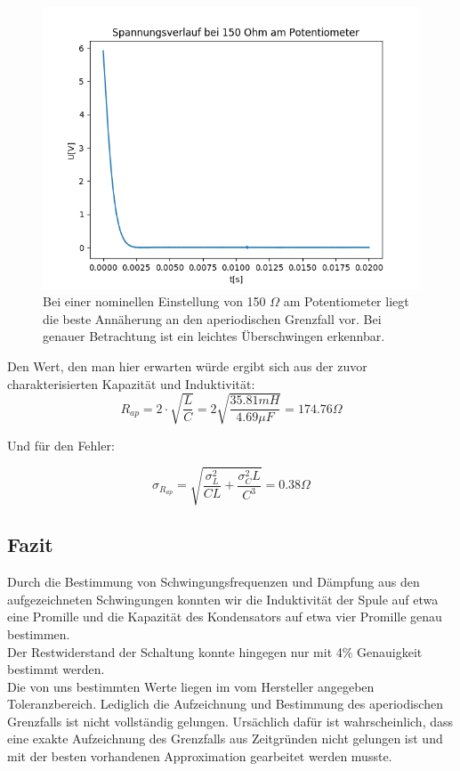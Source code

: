 \documentclass[12pt,a4paper]{article}
\begin{document}
\begin{figure}
\begin{center}
\includegraphics[scale=0.7]{Bilder/Spannungsverlauf150Ohm}
\caption{Bei einer nominellen Einstellung von 150 $\Omega$ am Potentiometer liegt die beste Annäherung an den aperiodischen Grenzfall vor. Bei genauer Betrachtung ist ein leichtes Überschwingen erkennbar.}
\label{fig:Aperiodisch}
\end{center}
\end{figure}


Den Wert, den man hier erwarten würde ergibt sich aus der zuvor charakterisierten Kapazität und Induktivität:
\begin{equation}
R_{ap}=2\cdot \sqrt{\frac{L}{C}}=2\sqrt{\frac{35.81mH}{4.69\mu F}}=174.76\Omega
\end{equation}

Und für den Fehler:

\begin{equation}
\sigma_{R_{ap}}=\sqrt{\frac{\sigma_L^2}{CL}+\frac{\sigma_C^2 L}{C^3}}=0.38 \Omega
\end{equation}



\subsection{Fazit}
Durch die Bestimmung von Schwingungsfrequenzen und Dämpfung aus den aufgezeichneten Schwingungen konnten wir die Induktivität der Spule auf etwa eine Promille und die Kapazität des Kondensators auf etwa vier Promille genau bestimmen.\\
Der Restwiderstand der Schaltung konnte hingegen nur mit 4\% Genauigkeit bestimmt werden.\\
Die von uns bestimmten Werte liegen im vom Hersteller angegeben Toleranzbereich.
Lediglich die Aufzeichnung und Bestimmung des aperiodischen Grenzfalls ist nicht vollständig gelungen. Ursächlich dafür ist wahrscheinlich, dass eine exakte Aufzeichnung des Grenzfalls aus Zeitgründen nicht gelungen ist und mit der besten vorhandenen Approximation gearbeitet werden musste.
\end{document}
